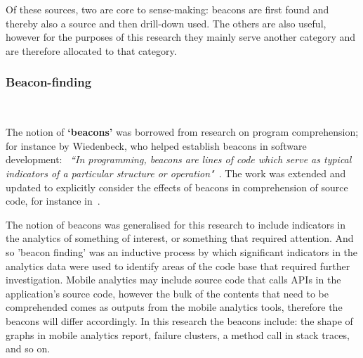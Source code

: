 Of these sources, two are core to sense-making: beacons are first found and thereby also a source and then drill-down used. The others are also useful, however for the purposes of this research they mainly serve another category and are therefore allocated to that category.




\subsubsection{Beacon-finding}~\label{section-beacon-finding-method} %

The notion of \textbf{`beacons'} was borrowed from research on program comprehension; for instance by Wiedenbeck, who helped establish beacons in software development: ~\emph{``In programming, beacons are lines of code which serve as typical indicators of a particular structure or operation"}~\citep[p.679]{WIEDENBECK1986_beacons_in_computer_program_comprehension}. The work was extended and updated to explicitly consider the effects of beacons in comprehension of source code, for instance in~\citealt{crosby2002_roles_beacons_play_in_comprehension_etc}.

The notion of beacons was generalised for this research to include indicators in the analytics of something of interest, or something that required attention.  And so 'beacon finding' was an inductive process by which significant indicators in the analytics data were used to identify areas of the code base that required further investigation.  Mobile analytics may include source code that calls APIs in the application's source code, however the bulk of the contents that need to be comprehended comes as outputs from the mobile analytics tools, therefore the beacons will differ accordingly. In this research the beacons include: the shape of graphs in mobile analytics report, failure clusters, a method call in stack traces, and so on.

